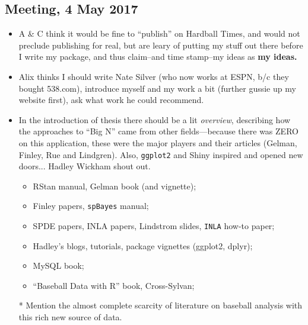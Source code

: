 \documentclass{article}
\begin{document}
\subsection*{Meeting, 4 May 2017}
\begin{itemize}
\item A \& C think it would be fine to ``publish'' on Hardball Times, and would not preclude publishing for real, but are leary of putting my stuff out there before I write my package, and thus claim--and time stamp--my ideas as {\bf my ideas.}
\item Alix thinks I should write Nate Silver (who now works at ESPN, b/c they bought 538.com), introduce myself and my work a bit (further gussie up my website first), ask what work he could recommend.
\item In the introduction of thesis there should be a lit {\it overview}, describing how the approaches to ``Big N'' came from other fields---because there was ZERO on this application, these were the major players and their articles (Gelman, Finley, Rue and Lindgren). Also, \verb|ggplot2| and Shiny inspired and opened new doors... Hadley Wickham shout out.
  \begin{itemize}
  \item RStan manual, Gelman book (and vignette);
  \item Finley papers, \verb|spBayes| manual;
  \item SPDE papers, INLA papers, Lindstrom slides, \verb|INLA| how-to paper;
  \item Hadley's blogs, tutorials, package vignettes (ggplot2, dplyr);
  \item MySQL book;
  \item ``Baseball Data with R'' book, Cross-Sylvan;
  \end{itemize}
* Mention the almost complete scarcity of literature on baseball analysis with this rich new source of data.


\end{itemize}
\end{document}
